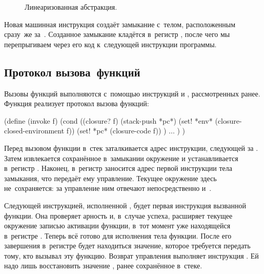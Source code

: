 \begin{figure}[t]\centering
%
\caption{Линеаризованная абстракция.}%
\label{compilation/bytes/customize/lin-abstraction/pic:subj}%
\end{figure}

Новая машинная инструкция  создаёт замыкание с~телом,
расположенным сразу~же за~. Созданное замыкание кладётся в~регистр
, после чего мы перепрыгиваем через его код к~следующей инструкции
программы.


\subsection{Протокол вызова~функций}\label{compilation/bytes/ssect:call-proto}

Вызовы функций выполняются с~помощью инструкций  и
, рассмотренных ранее.
Функция  реализует протокол вызова функций:

\begin{code:lisp}
(define (invoke f)
  (cond ((closure? f)
         (stack-push *pc*)
         (set! *env* (closure-closed-environment f))
         (set! *pc* (closure-code f)) )
        ... ) )
\end{code:lisp}

Перед вызовом функции в~стек заталкивается адрес инструкции, следующей за
. Затем извлекается сохранённое в~замыкании окружение и
устанавливается в~регистр . Наконец, в~регистр  заносится
адрес первой инструкции тела замыкания, что передаёт ему управление. Текущее
окружение здесь не~сохраняется: за управление ним отвечают непосредственно
 и~.

Следующей инструкцией, исполненной , будет первая инструкция вызванной
функции. Она проверяет арность и, в~случае успеха, расширяет текущее окружение
записью активации функции, в~тот момент уже находящейся в~регистре .
Теперь всё готово для исполнения тела функции. После его завершения в~регистре
 будет находиться значение, которое требуется передать тому, кто
вызывал эту функцию. Возврат управления выполняет инструкция . Ей
надо лишь восстановить значение , ранее сохранённое в~стеке.

